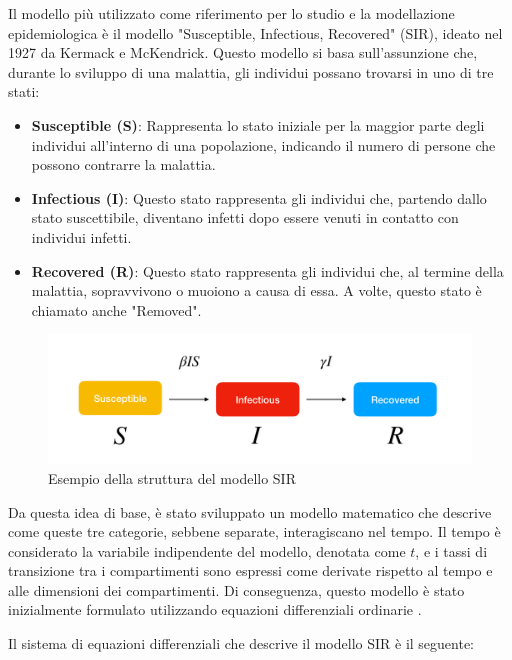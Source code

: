 Il modello più utilizzato come riferimento per lo studio e la 
modellazione epidemiologica è il modello "Susceptible, Infectious, 
Recovered" (SIR), ideato nel 1927 da Kermack e McKendrick. 
Questo modello si basa sull'assunzione che, durante lo sviluppo di una 
malattia, gli individui possano trovarsi in uno di tre stati:

\begin{itemize}
    \item \textbf{Susceptible (S)}: Rappresenta lo stato iniziale per la maggior parte degli individui all'interno di una popolazione, indicando il numero di persone che possono contrarre la malattia.
    \item \textbf{Infectious (I)}: Questo stato rappresenta gli individui che, partendo dallo stato suscettibile, diventano infetti dopo essere venuti in contatto con individui infetti.
    \item \textbf{Recovered (R)}: Questo stato rappresenta gli individui che, al termine della malattia, sopravvivono o muoiono a causa di essa. A volte, questo stato è chiamato anche "Removed".
\end{itemize}

\begin{figure}[H]
    \begin{center}
        \includegraphics[width=\linewidth]{img/sir.png}
        \caption{Esempio della struttura del modello SIR} 
        \label{fig:SIR_Structure}
    \end{center}
\end{figure}

Da questa idea di base, è stato sviluppato un modello matematico che 
descrive come queste tre categorie, sebbene separate, interagiscano 
nel tempo. Il tempo è considerato la variabile indipendente del modello, 
denotata come $t$, e i tassi di transizione tra i compartimenti sono 
espressi come derivate rispetto al tempo e alle dimensioni dei 
compartimenti. Di conseguenza, questo modello è stato inizialmente 
formulato utilizzando equazioni differenziali ordinarie \cite{Brauer2008}.

Il sistema di equazioni differenziali che descrive il modello SIR è il seguente:

